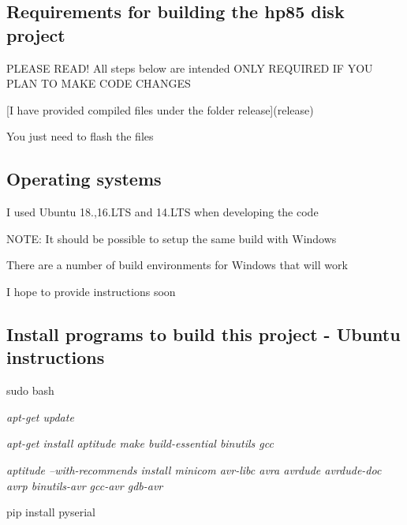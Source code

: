 \subsection*{Requirements for building the hp85 disk project}


\begin{DoxyItemize}
\item P\+L\+E\+A\+SE R\+E\+A\+D! All steps below are intended O\+N\+LY R\+E\+Q\+U\+I\+R\+ED IF Y\+OU P\+L\+AN TO M\+A\+KE C\+O\+DE C\+H\+A\+N\+G\+ES
\item \mbox{[}I have provided compiled files under the folder release\mbox{]}(release)
\begin{DoxyItemize}
\item You just need to flash the files
\end{DoxyItemize}
\end{DoxyItemize}

\subsection*{Operating systems}


\begin{DoxyItemize}
\item I used Ubuntu 18.,16.\+L\+TS and 14.\+L\+TS when developing the code
\begin{DoxyItemize}
\item N\+O\+TE\+: It should be possible to setup the same build with Windows
\begin{DoxyItemize}
\item There are a number of build environments for Windows that will work
\begin{DoxyItemize}
\item I hope to provide instructions soon
\end{DoxyItemize}
\end{DoxyItemize}
\end{DoxyItemize}
\end{DoxyItemize}

\subsection*{Install programs to build this project -\/ Ubuntu instructions}


\begin{DoxyItemize}
\item sudo bash
\item {\itshape apt-\/get update}
\item {\itshape apt-\/get install aptitude make build-\/essential binutils gcc}
\item {\itshape aptitude --with-\/recommends install minicom avr-\/libc avra avrdude avrdude-\/doc avrp binutils-\/avr gcc-\/avr gdb-\/avr}
\item pip install pyserial
\end{DoxyItemize}

